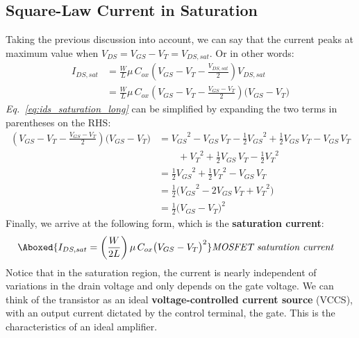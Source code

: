 \subsection{Square-Law Current in Saturation}
Taking the previous discussion into account, we can say that the current peaks at maximum value when 
$V_{DS} = V_{GS} - V_{T} = V_{DS,sat}$.  Or in other words:
    \begin{align}
        I_{DS,sat} &= \frac{W}{L}\mu\,C_{ox}\left(V_{GS} - V_T - \frac{V_{DS,sat}}{2}\right)V_{DS,sat}\\[0.25cm]
        &= \frac{W}{L}\mu\,C_{ox}\left(V_{GS} - V_T - \frac{V_{GS} - V_T}{2}\right) \big(V_{GS} - V_T\big)
        \label{eq:ids_saturation_long}
    \end{align}
\vspace{0.25cm}
\emph{Eq.~\ref{eq:ids_saturation_long}} can be simplified by expanding the two terms in parentheses on the RHS:
    \begin{align*}
        \left(V_{GS} - V_T - \frac{V_{GS} - V_T}{2}\right) \big(V_{GS} - V_T\big)
        &= {V_{GS}}^2 - V_{GS}\,V_T - \frac{1}{2}{V_{GS}}^2 + \frac{1}{2}V_{GS}\,V_T - V_{GS}\,V_T\\[0.15cm]
        &\qquad + {V_T}^2 + \frac{1}{2}V_{GS}\,V_T - \frac{1}{2}{V_T}^2\\[0.45cm]
        &=\frac{1}{2}{V_{GS}}^2 + \frac{1}{2}{V_T}^2 - V_{GS}\,V_T\\[0.45cm]
        &=\frac{1}{2}\big( {V_{GS}}^2 - 2V_{GS}\,V_T + {V_T}^2 \big)\\[0.45cm]
        &=\frac{1}{2} {\big(V_{GS} - V_T\big)}^2
    \end{align*}
Finally, we arrive at the following form, which is the \textbf{saturation current}:
    \begin{align}
        \Aboxed{ I_{DS,sat} = \left( \frac{W}{2L} \right) \mu\,C_{ox} {\big(V_{GS} - V_T\big)}^2 } &\textit{MOSFET saturation current}
        \label{eq:ids_saturation}
    \end{align}
Notice that in the saturation region, the current is nearly independent of variations in the drain voltage and only depends on the gate voltage.  We can think of the transistor as an ideal \textbf{voltage-controlled current source} (VCCS), with an output current dictated by the control terminal, the gate.  This is the characteristics of an ideal amplifier.
